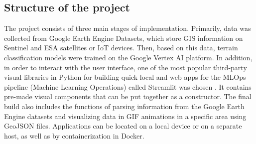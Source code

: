 \documentclass[3p,times,procedia]{elsarticle}
\begin{document}
\subsection{Structure of the project}
The project consists of three main stages of implementation. Primarily, data was collected from Google Earth Engine Datasets, which store GIS information on Sentinel and ESA satellites or IoT devices. Then, based on this data, terrain classification models were trained on the Google Vertex AI platform. In addition, in order to interact with the user interface, one of the most popular third-party visual libraries in Python for building quick local and web apps for the MLOps pipeline (Machine Learning Operations) called Streamlit was chosen \cite{Wazir2023}. It contains pre-made visual components that can be put together as a constructor. The final build also includes the functions of parsing information from the Google Earth Engine datasets and visualizing data in GIF animations in a specific area using GeoJSON files. Applications can be located on a local device or on a separate host, as well as by containerization in Docker.
\end{document}
